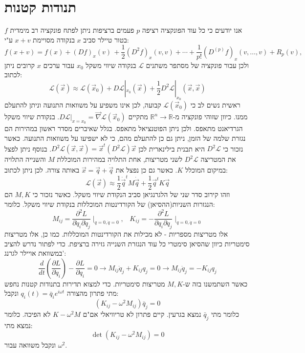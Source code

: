 \documentclass{tstextbook}
\begin{document}
\section{תנודות קטנות}

אנו יודעים כי כל עוד הפונקציה רציפה \(p\) פעמים ברציפות ניתן לפתח פונקציה רב מימדית \(f\) בטור טיילר סביב \(x\) בנקודה מסויימת \(x+v\) ע"י:
$$f(x+v)=f(x)+(D f)_{x}(v)\,+\frac{1}{2}(D^{2}f)_{x}(v,v)+\cdots+\frac{1}{p!}(D^{(p)}f)_{x}(v,\ldots,v)+R_{p}(v),$$
ולכן עבור פונקציה של מסתפר משתנים \(\mathcal{L}\) בנקודה שיווי משקל \(x_{0}\) עבור ערכים \(x\) קרובים ניתן לכתוב:
$$\mathcal{L}\left( \vec{x} \right) \approx  \mathcal{L}\left( \vec{x}_{0} \right)+D\mathcal{L} |_{x_{0}}\left( \vec{x} \right)+\frac{1}{2}D^2\mathcal{L} |_{x_{0}}\left( \vec{x},\vec{x} \right)  $$
ראשית נשים לב כי \(\mathcal{L}\left( \vec{x}_{0} \right)\) קבועה, לכן אינו משפיע על משוואות התנועה וניתן להתעלם ממנו.
כיוון שזוהי פונקציה מ-\(\mathbb{R} ^n\to \mathbb{R}\) מתקיים \(D\mathcal{L}|_{x=x_{0}}=\vec{\nabla} \mathcal{L}\left( \vec{x}_{0} \right)\). בנקודת שיווי משקל הגרדיאנט מתאפס. ולכן ניתן הפוטנציאל מתאפס. בגלל שאיברים מסדר ראשון במהירות הם נגזרת שלמה של הזמן, ניתן גם כן להתעלם מהם, כי לא ישפיעו על משוואות התנועה.
כאשר נזכור כי \(D^2\mathcal{L}\) היא תבנית בילינארית לכן \(D^2\mathcal{L} \left( \vec{x},\vec{x} \right)=\vec{x}^t \left( D^2\mathcal{L} \right)\vec{x}\). בנוסף ניתן לפצל את המטריצה \(D^2\mathcal{L}\) לשני מטריצות, אחת התלויה במהירות המוכללת \(M\) והשנייה התלויה במיקום המוכלל \(K\). כאשר גם כן נפצל את \(\vec{x}=\vec{q}+\dot{\vec{q}}\) באותה צורה. לכן ניתן לכתוב:
$$\mathcal{L} \left( \vec{x} \right)\approx \frac{1}{2}\dot{\vec{q}}^t M \dot{\vec{q}}+\frac{1}{2}\vec{q}^tK\vec{q}$$
וזהו קירוב סדר שני של הלגרנגיאן סביב הנקודת שיווי משקל. כאשר נזכור כי \(M,K\) הם הנגזרות השניות(ההסיאן) של הקורדינטות המוכללות בנקודת שיווי משקל. כלומר:
$$M_{i j}={\frac{\partial^{2}L}{\partial\dot{q}_{i}\partial\dot{q}_{j}}}\mid_{q=0,\dot{q}=0},\;\;\;K_{i j}=-{\frac{\partial^{2}L}{\partial q_{i}\partial q_{j}}}\mid_{q=0,\dot{q}=0}$$
אלו מטריצות מספריות - לא מכילות את הקורדינטות המוכללות. כמו כן, אלו מטריצות סימטריות כיוון שהסיאן סימטרי כל עוד הנגזרת השנייה גזירה ברציפת.
כדי לפתור נדרש להציב במשוואת אויילר לגרנג':
$$\frac{d}{d t}\left(\frac{\partial L}{\partial{\dot{q}}_{i}}\right)-\frac{\partial L}{\partial q_{i}}=0\rightarrow M_{i j}{\ddot{q}}_{j}+K_{i j}q_{j}=0\rightarrow M_{i j}{\ddot{q}}_{j}=-K_{i j}q_{j}$$
כאשר השתמשנו בזה ש-\(M,K\) מטריצות סימטריות. כדי למצוא תדירות בתנודות קטנות נחפש מתי פתרון מהצורה \(q_{i}(t)=\bar{q}_{i}e^{i\omega t}\) ונקבל:
$$\left(K_{i j}-\omega^{2}M_{i j}\right)\bar{q}_{j}=0$$
כלומר מתי \(\bar{q}_{j}\) נמצא בגרעין. קיים פתרון לא טריוויאלי אם"ם \(K-\omega^2M\) לא הפיכה. כלומר נמצא מתי:
$$\operatorname*{det}\left(K_{i j}-\omega^{2}M_{i j}\right)=0$$
ונקבל משוואה עבור \(\omega^2\). 
\end{document}
